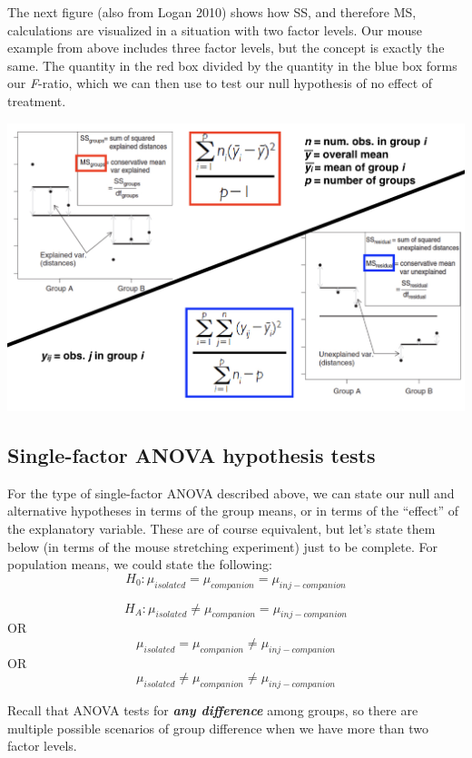 \documentclass[
]{book}
\begin{document}
The next figure (also from Logan 2010) shows how SS, and therefore MS, calculations are visualized in a situation with two factor levels. Our mouse example from above includes three factor levels, but the concept is exactly the same. The quantity in the red box divided by the quantity in the blue box forms our \emph{F}-ratio, which we can then use to test our null hypothesis of no effect of treatment.

\begin{center}\includegraphics[width=0.9\linewidth]{images/images_5b.019} \end{center}

\hypertarget{single-factor-anova-hypothesis-tests}{%
\subsection{Single-factor ANOVA hypothesis tests}\label{single-factor-anova-hypothesis-tests}}

For the type of single-factor ANOVA described above, we can state our null and alternative hypotheses in terms of the group means, or in terms of the ``effect'' of the explanatory variable. These are of course equivalent, but let's state them below (in terms of the mouse stretching experiment) just to be complete. For population means, we could state the following:
\[H_0:\mu_{isolated}=\mu_{companion}=\mu_{inj-companion}\]

\[H_A:\mu_{isolated}\neq\mu_{companion}=\mu_{inj-companion}\]
OR
\[\mu_{isolated}=\mu_{companion}\neq\mu_{inj-companion}\]
OR
\[\mu_{isolated}\neq\mu_{companion}\neq\mu_{inj-companion}\]

Recall that ANOVA tests for \textbf{\emph{any difference}} among groups, so there are multiple possible scenarios of group difference when we have more than two factor levels.
\end{document}
